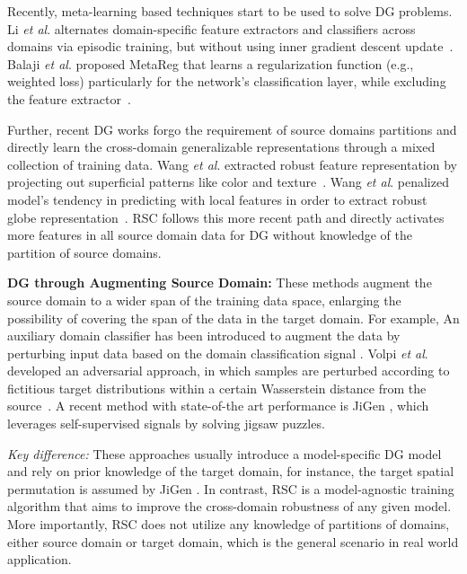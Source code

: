 \documentclass[runningheads]{llncs}
\begin{document}
Recently, meta-learning based techniques start to be used to solve DG problems.
Li \textit{et al}. alternates domain-specific feature extractors and classifiers across domains via episodic training, but without using inner gradient descent update~\cite{li2019episodic}. 
Balaji \textit{et al}. proposed MetaReg that learns a regularization function (e.g., weighted  loss) particularly for the network’s
classification layer, while excluding the feature extractor~\cite{balaji2018metareg}. 

Further, recent DG works forgo the requirement of source domains partitions and directly learn the 
cross-domain generalizable representations through 
a mixed collection of training data. 
Wang \textit{et al}. extracted robust feature representation by projecting out superficial patterns like color and texture~\cite{wang2018learning}. 
Wang \textit{et al}. penalized model’s tendency in predicting with local features in order to extract robust globe representation~\cite{wang2019learning}. 
RSC follows this more recent path and directly activates more features in all source domain data for DG 
without knowledge of the partition of source domains.



\textbf{DG through Augmenting Source Domain:} 
These methods augment the source domain to a wider span of the training data space, 
enlarging the possibility of covering the span of the data in the target domain. 
For example, 
An auxiliary domain classifier has been introduced 
to augment the data 
by perturbing input data based on the domain classification signal  \cite{shankar2018generalizing}. 
Volpi \textit{et al}. developed an adversarial approach, in which samples are perturbed according to fictitious target distributions within a certain Wasserstein distance from the source~\cite{volpi2018generalizing}. 
A recent method with state-of-the art performance is JiGen \cite{carlucci2019domain}, which leverages self-supervised signals by solving jigsaw puzzles.

\emph{Key difference:}
These approaches usually introduce a model-specific DG model and rely on prior knowledge of the target domain, for instance, the target spatial permutation is assumed by JiGen \cite{carlucci2019domain}. 
In contrast, RSC is a model-agnostic training algorithm that 
aims to improve the cross-domain robustness of any given model. More importantly, RSC does not utilize any knowledge of partitions of domains, either source domain or target domain, which is the general scenario in real world application.
\end{document}
